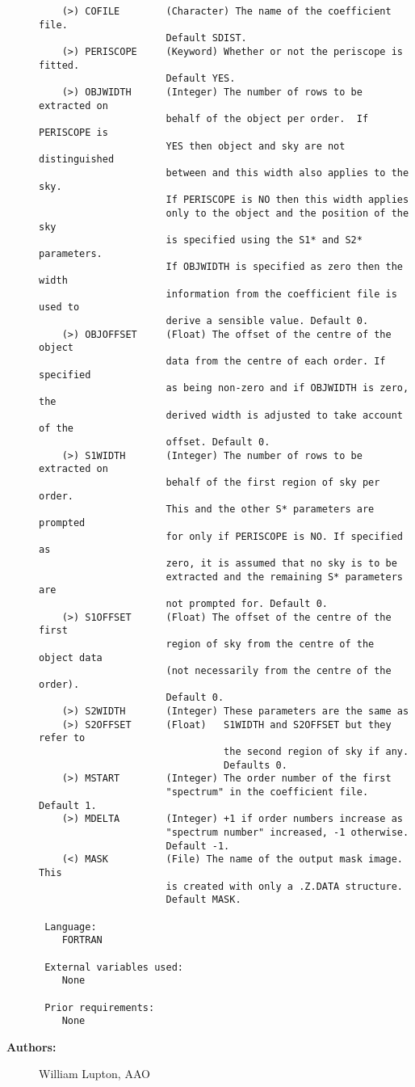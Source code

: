 \begin{description}
\begin{verbatim}
    (>) COFILE        (Character) The name of the coefficient file.
                      Default SDIST.
    (>) PERISCOPE     (Keyword) Whether or not the periscope is fitted.
                      Default YES.
    (>) OBJWIDTH      (Integer) The number of rows to be extracted on
                      behalf of the object per order.  If PERISCOPE is
                      YES then object and sky are not distinguished
                      between and this width also applies to the sky.
                      If PERISCOPE is NO then this width applies
                      only to the object and the position of the sky
                      is specified using the S1* and S2* parameters.
                      If OBJWIDTH is specified as zero then the width
                      information from the coefficient file is used to
                      derive a sensible value. Default 0.
    (>) OBJOFFSET     (Float) The offset of the centre of the object
                      data from the centre of each order. If specified
                      as being non-zero and if OBJWIDTH is zero, the
                      derived width is adjusted to take account of the
                      offset. Default 0.
    (>) S1WIDTH       (Integer) The number of rows to be extracted on
                      behalf of the first region of sky per order.
                      This and the other S* parameters are prompted
                      for only if PERISCOPE is NO. If specified as
                      zero, it is assumed that no sky is to be
                      extracted and the remaining S* parameters are
                      not prompted for. Default 0.
    (>) S1OFFSET      (Float) The offset of the centre of the first
                      region of sky from the centre of the object data
                      (not necessarily from the centre of the order).
                      Default 0.
    (>) S2WIDTH       (Integer) These parameters are the same as
    (>) S2OFFSET      (Float)   S1WIDTH and S2OFFSET but they refer to
                                the second region of sky if any.
                                Defaults 0.
    (>) MSTART        (Integer) The order number of the first
                      "spectrum" in the coefficient file. Default 1.
    (>) MDELTA        (Integer) +1 if order numbers increase as
                      "spectrum number" increased, -1 otherwise.
                      Default -1.
    (<) MASK          (File) The name of the output mask image. This
                      is created with only a .Z.DATA structure.
                      Default MASK.

 Language:
    FORTRAN

 External variables used:
    None

 Prior requirements:
    None

\end{verbatim}

\item [{\bf Authors:}]
 William Lupton, AAO
\end{description}
